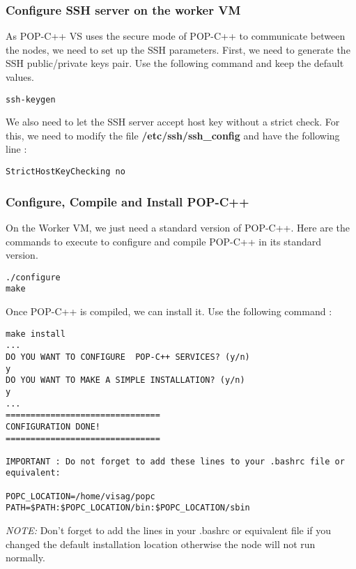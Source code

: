 \subsubsection{Configure SSH server on the worker VM}
\label{lb:workerssh}
As POP-C++ VS uses the secure mode of POP-C++ to communicate between the nodes, we need to set up the SSH parameters. First, we need to generate the SSH public/private keys pair. Use the following command and keep the default values.\s

\begin{lstlisting}
ssh-keygen
\end{lstlisting}\s

We also need to let the SSH server accept host key without a strict check. For this, we need to modify the file \textbf{/etc/ssh/ssh\_config} and have the following line : \s

\begin{lstlisting}
StrictHostKeyChecking no
\end{lstlisting}

\subsubsection{Configure, Compile and Install POP-C++}
\label{lb:workerpopc}
On the Worker VM, we just need a standard version of POP-C++. Here are the commands to execute to configure and compile POP-C++ in its standard version.\s
\begin{lstlisting}
./configure
make
\end{lstlisting}

Once POP-C++ is compiled, we can install it. Use the following command : \s

\begin{lstlisting}
make install 
...
DO YOU WANT TO CONFIGURE  POP-C++ SERVICES? (y/n)
y
DO YOU WANT TO MAKE A SIMPLE INSTALLATION? (y/n) 
y
...
===============================
CONFIGURATION DONE!
===============================

IMPORTANT : Do not forget to add these lines to your .bashrc file or 
equivalent:

POPC_LOCATION=/home/visag/popc
PATH=$PATH:$POPC_LOCATION/bin:$POPC_LOCATION/sbin
\end{lstlisting}

\textit{NOTE:} Don't forget to add the lines in your .bashrc or equivalent file if you changed the default installation location otherwise the node will not run normally.